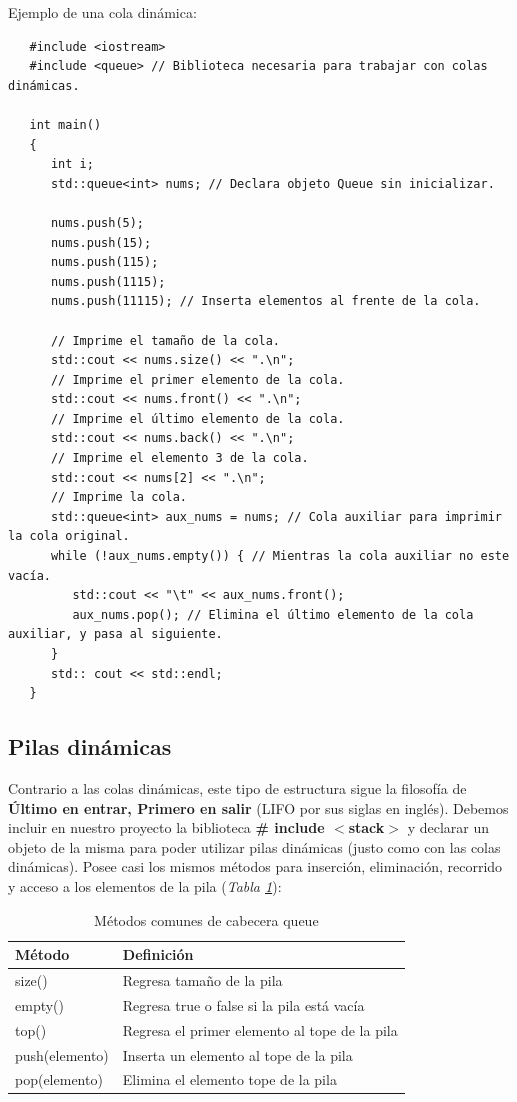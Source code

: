 Ejemplo de una cola dinámica:
\begin{lstlisting}
   #include <iostream>
   #include <queue> // Biblioteca necesaria para trabajar con colas dinámicas.

   int main()
   {
      int i;
      std::queue<int> nums; // Declara objeto Queue sin inicializar.

      nums.push(5);
      nums.push(15);
      nums.push(115);
      nums.push(1115);
      nums.push(11115); // Inserta elementos al frente de la cola.

      // Imprime el tamaño de la cola.
      std::cout << nums.size() << ".\n";
      // Imprime el primer elemento de la cola.
      std::cout << nums.front() << ".\n";
      // Imprime el último elemento de la cola.
      std::cout << nums.back() << ".\n";
      // Imprime el elemento 3 de la cola.
      std::cout << nums[2] << ".\n";
      // Imprime la cola.
      std::queue<int> aux_nums = nums; // Cola auxiliar para imprimir la cola original.
      while (!aux_nums.empty()) { // Mientras la cola auxiliar no este vacía.
         std::cout << "\t" << aux_nums.front(); 
         aux_nums.pop(); // Elimina el último elemento de la cola auxiliar, y pasa al siguiente.
      }
      std:: cout << std::endl;
   }
\end{lstlisting}


\subsection{Pilas dinámicas}
\hspace{0.55cm}Contrario a las colas dinámicas, este tipo de estructura sigue la filosofía de \textbf{Último en entrar, Primero en salir} (LIFO por sus siglas en inglés). Debemos incluir en nuestro proyecto la biblioteca \textbf{\# include $<$stack$>$} y declarar un objeto de la misma para poder utilizar pilas dinámicas (justo como con las colas dinámicas). Posee casi los mismos métodos para inserción, eliminación, recorrido y acceso a los elementos de la pila (\textit{Tabla \ref{tab: 12}}):
\begin{table}[H]
    \begin{center}
        \caption{Métodos comunes de cabecera queue}
        \label{tab: 12}
        \begin{tabular}{l | l}
            \hline
            \textbf{Método} & \textbf{Definición} \\
            \hline
            size()			& Regresa tamaño de la pila \\
            empty()			& Regresa true o false si la pila está vacía \\
            top()			& Regresa el primer elemento al tope de la pila \\
            push(elemento)	& Inserta un elemento al tope de la pila \\
            pop(elemento)	& Elimina el elemento tope de la pila \\
            \hline
        \end{tabular}
    \end{center}
\end{table}

